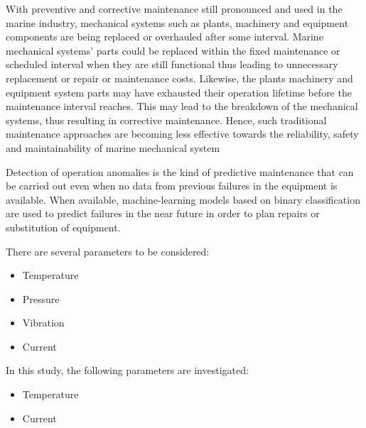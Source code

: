 With preventive and corrective maintenance still pronounced and used in the marine industry, mechanical systems such as plants, machinery and equipment components are being replaced or overhauled after some interval. Marine mechanical systems’ parts could be replaced within the fixed maintenance or scheduled interval when they are still functional thus leading to unnecessary replacement or repair or maintenance costs. Likewise, the plants machinery and equipment system parts may have exhausted their operation lifetime before the maintenance interval reaches. This may lead to the breakdown of the mechanical systems, thus resulting in corrective maintenance. Hence, such traditional maintenance approaches are becoming less effective towards the reliability, safety and maintainability of marine mechanical system 

Detection of operation anomalies is the kind of predictive maintenance that can be carried out even when no data from previous failures in the equipment is available. When available, machine-learning models based on binary classification are used to predict failures in the near future in order to plan repairs or substitution of equipment\cite{han_motor_2019}.

There are several parameters to be considered:
\begin{itemize}
	\item Temperature 
	\item Pressure
	\item Vibration
	\item Current
\end{itemize}
In this study, the following parameters are investigated:
\begin{itemize}
	\item Temperature
	\item Current
\end{itemize}
	
	

